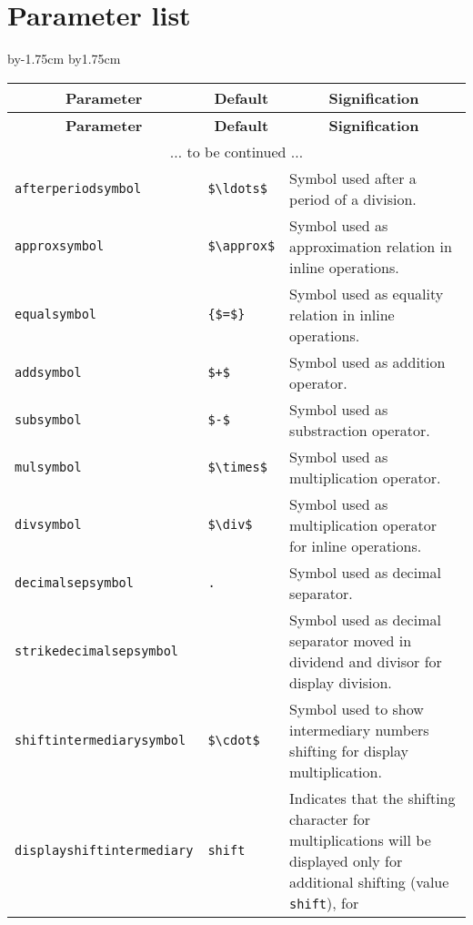 \documentclass[12pt]{report}
\begin{document}
\section{Parameter list}
\label{sec:Liste des parametres}
%
\begingroup
\advance\hoffset by-1.75cm \advance\linewidth by1.75cm
\begin{longtable}{|l|l|p{7cm}|}
  \hline
  \multicolumn{1}{|c|}{\textbf{Parameter}} &
  \multicolumn{1}{c|}{\textbf{Default}} &
  \multicolumn{1}{c|}{\textbf{Signification}} \\\hline\hline
  \endfirsthead
  \hline
  \multicolumn{1}{|c|}{\textbf{Parameter}} &
  \multicolumn{1}{c|}{\textbf{Default}} &
  \multicolumn{1}{c|}{\textbf{Signification}} \\\hline\hline
  \endhead
  \hline
  \multicolumn{3}{|c|}{$\ldots$ to be continued $\ldots$}\\
  \hline
  \endfoot
  \hline
  \endlastfoot
  \verb+afterperiodsymbol+ &
  \verb+$\ldots$+ &
  Symbol used after a period of a division. \\\hline 
  \verb+approxsymbol+ &
  \verb+$\approx$+ &
  Symbol used as approximation relation in inline operations. \\\hline
  \verb+equalsymbol+ &
  \verb+{$=$}+ &
  Symbol used as equality relation in inline operations. \\\hline
  \verb+addsymbol+ &
  \verb-$+$- &
  Symbol used as addition operator. \\\hline
  \verb+subsymbol+ &
  \verb+$-$+ &
  Symbol used as substraction operator. \\\hline
  \verb+mulsymbol+ &
  \verb+$\times$+ &
  Symbol used as multiplication operator. \\\hline
  \verb+divsymbol+ &
  \verb+$\div$+ &
  Symbol used as multiplication operator for inline
  operations. \\\hline
  \verb+decimalsepsymbol+ &
  \verb+.+ &
  Symbol used as decimal separator. \\\hline
  \verb+strikedecimalsepsymbol+ &
  &
  Symbol used as decimal separator moved in dividend and divisor for
  display division. \\\hline
  \verb+shiftintermediarysymbol+ &
  \verb+$\cdot$+ &
  Symbol used to show intermediary numbers shifting for display
  multiplication. \\\hline
  \verb+displayshiftintermediary+ &
  \verb+shift+ &
  Indicates that the shifting character for multiplications will be
  displayed only for additional shifting (value \verb+shift+), for

\end{longtable}
\end{document}

